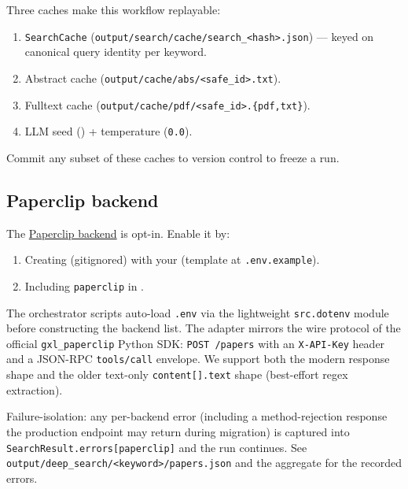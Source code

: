 \documentclass[
  english,
]{article}
\providecommand{\tightlist}{%
  \setlength{\itemsep}{0pt}\setlength{\parskip}{0pt}}
\begin{document}
Three caches make this workflow replayable:

\begin{enumerate}
\def\labelenumi{\arabic{enumi}.}
\tightlist
\item
  \texttt{SearchCache}
  (\texttt{output/search/cache/search\_\textless{}hash\textgreater{}.json})
  --- keyed on canonical query identity per keyword.
\item
  Abstract cache
  (\texttt{output/cache/abs/\textless{}safe\_id\textgreater{}.txt}).
\item
  Fulltext cache
  (\texttt{output/cache/pdf/\textless{}safe\_id\textgreater{}.\{pdf,txt\}}).
\item
  LLM seed () +
  temperature (\texttt{0.0}).
\end{enumerate}

Commit any subset of these caches to version control to freeze a run.

\subsection{Paperclip backend}\label{paperclip-backend}

The \href{https://paperclip.gxl.ai}{Paperclip backend} is opt-in. Enable
it by:

\begin{enumerate}
\def\labelenumi{\arabic{enumi}.}
\tightlist
\item
  Creating 
  (gitignored) with your  (template
  at \texttt{.env.example}).
\item
  Including \texttt{paperclip} in
  .
\end{enumerate}

The orchestrator scripts auto-load \texttt{.env} via the lightweight
\texttt{src.dotenv} module before constructing the backend list. The
 adapter mirrors the wire protocol of the
official \texttt{gxl\_paperclip} Python SDK: \texttt{POST\ /papers} with
an \texttt{X-API-Key} header and a JSON-RPC \texttt{tools/call}
envelope. We support both the modern 
response shape and the older text-only \texttt{content{[}{]}.text} shape
(best-effort regex extraction).

Failure-isolation: any per-backend error (including a method-rejection
response the production endpoint may return during migration) is
captured into \texttt{SearchResult.errors{[}paperclip{]}} and the run
continues. See
\texttt{output/deep\_search/\textless{}keyword\textgreater{}/papers.json}
and the aggregate  for the recorded errors.
\end{document}
